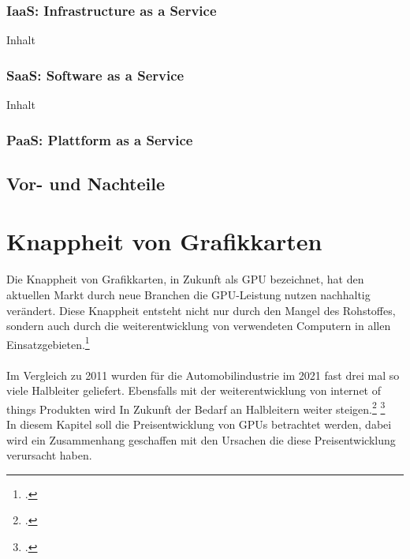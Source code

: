 \documentclass[12pt,toc=bib,toc=listof]{scrreprt}
\begin{document}

\subsection{IaaS: Infrastructure as a Service}
\label{sec:IaaS: Infrastructure as a Service}

Inhalt

\subsection{SaaS: Software as a Service}
\label{sec:SaaS: Software as a Service}

Inhalt

\subsection{PaaS: Plattform as a Service}
\label{sec:PaaS: Plattform as a Service}


\section{Vor- und Nachteile}
\label{Vor- und Nachteile}


\chapter{Knappheit von Grafikkarten} %
\label{sec:Knappheit von Grafikkarten}

Die Knappheit von Grafikkarten, in Zukunft als GPU bezeichnet, hat den
aktuellen Markt durch neue Branchen die GPU-Leistung nutzen nachhaltig verändert.
Diese Knappheit entsteht nicht nur durch den Mangel des Rohstoffes, sondern auch durch die 
weiterentwicklung von verwendeten Computern in allen Einsatzgebieten.\footcite [Vgl.] []{Voas.2021}
\\
\\
Im Vergleich zu 2011 wurden für die Automobilindustrie im 2021 fast drei mal so viele
Halbleiter geliefert. Ebensfalls mit der weiterentwicklung von internet of things Produkten wird In
Zukunft der Bedarf an Halbleitern weiter steigen.\footcite [Vgl.] []{Bill_McClean} \footcite [Vgl.] []{Voas.2021} 
\\In diesem Kapitel soll die Preisentwicklung von GPUs betrachtet werden, dabei wird 
ein Zusammenhang geschaffen mit den Ursachen die diese Preisentwicklung 
verursacht haben.
\\
\end{document}
